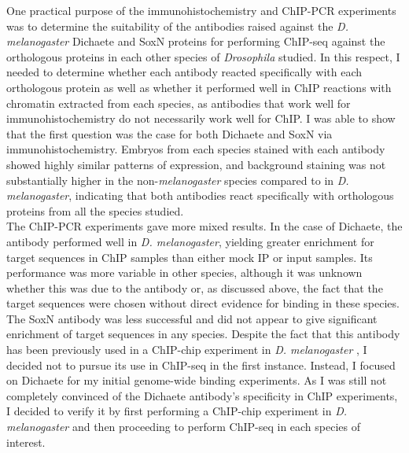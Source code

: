 One practical purpose of the immunohistochemistry and ChIP-PCR experiments was to determine the suitability of the antibodies raised against the \emph{D. melanogaster} Dichaete and SoxN proteins for performing ChIP-seq against the orthologous proteins in each other species of \emph{Drosophila} studied. In this respect, I needed to determine whether each antibody reacted specifically with each orthologous protein as well as whether it performed well in ChIP reactions with chromatin extracted from each species, as antibodies that work well for immunohistochemistry do not necessarily work well for ChIP. I was able to show that the first question was the case for both Dichaete and SoxN via immunohistochemistry. Embryos from each species stained with each antibody showed highly similar patterns of expression, and background staining was not substantially higher in the non-\emph{melanogaster} species compared to in \emph{D. melanogaster}, indicating that both antibodies react specifically with orthologous proteins from all the species studied.\\

The ChIP-PCR experiments gave more mixed results. In the case of Dichaete, the antibody performed well in \emph{D. melanogaster}, yielding greater enrichment for target sequences in ChIP samples than either mock IP or input samples. Its performance was more variable in other species, although it was unknown whether this was due to the antibody or, as discussed above, the fact that the target sequences were chosen without direct evidence for binding in these species. The SoxN antibody was less successful and did not appear to give significant enrichment of target sequences in any species. Despite the fact that this antibody has been previously used in a ChIP-chip experiment in \emph{D. melanogaster} \citep{ferrero_soxneuro_2014}, I decided not to pursue its use in ChIP-seq in the first instance. Instead, I focused on Dichaete for my initial genome-wide binding experiments. As I was still not completely convinced of the Dichaete antibody's specificity in ChIP experiments, I decided to verify it by first performing a ChIP-chip experiment in \emph{D. melanogaster} and then proceeding to perform ChIP-seq in each species of interest.\\
 
